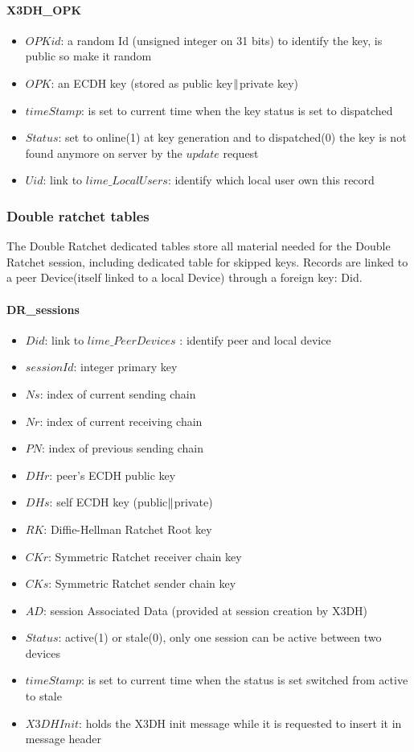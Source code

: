 \documentclass[a4paper,11pt]{article}
\begin{document}
  \paragraph*{X3DH\_OPK}
    \begin{itemize}
      \item $OPKid$: a random Id (unsigned integer on 31 bits) to identify the key, is public so make it random
      \item $OPK$: an ECDH key (stored as public key$\Arrowvert $private key)
      \item $timeStamp$: is set to current time when the key status is set to dispatched
      \item $Status$: set to online(1) at key generation and to dispatched(0) the key is not found anymore on server by the $update$ request
      \item $Uid$: link to $lime\_LocalUsers$: identify which local user own this record
    \end{itemize}
              
    \subsubsection{Double ratchet tables}
    The Double Ratchet dedicated tables store all material needed for the Double Ratchet session, including dedicated table for skipped keys. Records are linked to a peer Device(itself linked to a local Device) through a foreign key: Did.
    \paragraph*{DR\_sessions}
    \begin{itemize}
      \item $Did$: link to $lime\_PeerDevices$ : identify peer and local device
      \item $sessionId$: integer primary key
      \item $Ns$: index of current sending chain
      \item $Nr$: index of current receiving chain
      \item $PN$: index of previous sending chain
      \item $DHr$: peer's ECDH public key
      \item $DHs$: self ECDH key (public$\Arrowvert $private)
      \item $RK$: Diffie-Hellman Ratchet Root key
      \item $CKr$: Symmetric Ratchet receiver chain key
      \item $CKs$: Symmetric Ratchet sender chain key
      \item $AD$: session Associated Data (provided at session creation by X3DH)
      \item $Status$: active(1) or stale(0), only one session can be active between two devices
      \item $timeStamp$: is set to current time when the status is set switched from active to stale
      \item $X3DHInit$: holds the X3DH init message while it is requested to insert it in message header
    \end{itemize}
    
\end{document}
